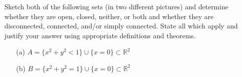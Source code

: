 \begin{problem}
Sketch both of the following sets (in two different pictures) and determine whether they are open, closed, neither, or both and whether they are disconnected, connected, and/or simply connected. State all which apply and justify your answer using appropriate definitions and theorems.
\begin{enumerate}
\item[(a)] $A=\{x^2+y^2<1\}\cup\{x=0\}\subset\mathbb{R}^2$
\item[(b)] $B=\{x^2+y^2=1\}\cup\{x=0\}\subset\mathbb{R}^2$
\end{enumerate}
\end{problem}